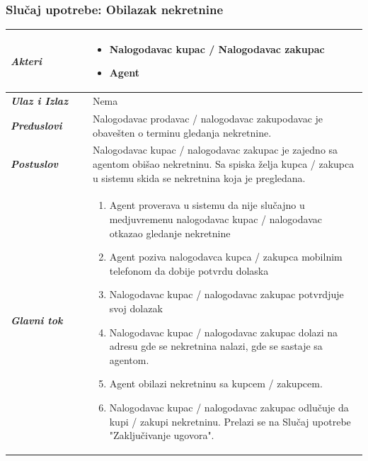 \documentclass[20pt]{article}
\begin{document}
\subsubsection{\bfseries \large Slu\v{c}aj upotrebe: Obilazak nekretnine}
\begin{center}
\begin{tabular}{p{0.23\linewidth} p{0.77\linewidth}}
 \hline
 {\it \bfseries Akteri} & \begin{itemize}
    \item Nalogodavac kupac / Nalogodavac zakupac
    \item Agent
\end{itemize}\\
\hline

 {\it \bfseries Ulaz i Izlaz} & Nema\\   
 \hline
 \hline
 {\it \bfseries Preduslovi} & Nalogodavac prodavac / nalogodavac zakupodavac je obave\v sten o terminu gledanja nekretnine.\\
 \hline
 
 {\it \bfseries Postuslov} & Nalogodavac kupac / nalogodavac zakupac je zajedno sa agentom obi\v sao nekretninu. Sa spiska \v zelja kupca / zakupca u sistemu skida se nekretnina koja je pregledana.\\
 \hline


     {\it \bfseries Glavni tok} &  
     \begin{enumerate}
         \item  Agent proverava u sistemu da nije slu\v cajno u medjuvremenu nalogodavac kupac / nalogodavac otkazao gledanje nekretnine
         \item  Agent poziva nalogodavca kupca / zakupca mobilnim telefonom da dobije potvrdu dolaska
         \item  Nalogodavac kupac / nalogodavac zakupac potvrdjuje svoj dolazak
         \item  Nalogodavac kupac / nalogodavac zakupac dolazi na adresu gde se nekretnina nalazi, gde se sastaje sa agentom.
         \item Agent obilazi nekretninu sa kupcem / zakupcem.
         \item Nalogodavac kupac / nalogodavac zakupac odlu\v cuje da kupi / zakupi nekretninu. Prelazi se na Slu\v{c}aj upotrebe "Zaklju\v civanje ugovora".
    \end{enumerate}\\ 
\hline
\end{tabular}
\end{center} 
\end{document}
